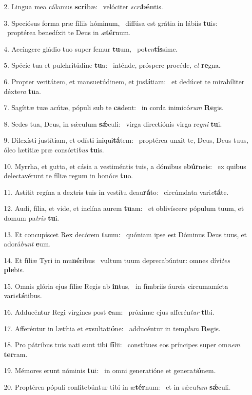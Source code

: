 2. Lingua mea cálamus \textbf{scri}bæ: \ast\  velóciter \textit{scri}\textbf{bén}tis.\

3. Speciósus forma præ fíliis hóminum, \dag\  diffúsa est grátia in lábiis \textbf{tu}is: \ast\  proptérea benedíxit te Deus in \textit{æ}\textbf{tér}num.\

4. Accíngere gládio tuo super femur \textbf{tu}um, \ast\  pot\textit{en}\textbf{tís}sime.\

5. Spécie tua et pulchritúdine \textbf{tu}a: \ast\  inténde, próspere procéde, \textit{et} \textbf{re}gna.\

6. Propter veritátem, et mansuetúdinem, et jus\textbf{tí}tiam: \ast\  et dedúcet te mirabíliter déxte\textit{ra} \textbf{tu}a.\

7. Sagíttæ tuæ acútæ, pópuli sub te \textbf{ca}dent: \ast\  in corda inimicó\textit{rum} \textbf{Re}gis.\

8. Sedes tua, Deus, in sǽculum \textbf{sǽ}culi: \ast\  virga directiónis virga re\textit{gni} \textbf{tu}i.\

9. Dilexísti justítiam, et odísti iniqui\textbf{tá}tem: \ast\  proptérea unxit te, Deus, Deus tuus, óleo lætítiæ præ consórti\textit{bus} \textbf{tu}is.\

10. Myrrha, et gutta, et cásia a vestiméntis tuis, a dómibus e\textbf{búr}neis: \ast\  ex quibus delectavérunt te fíliæ regum in honó\textit{re} \textbf{tu}o.\

11. Astitit regína a dextris tuis in vestítu deau\textbf{rá}to: \ast\  circúmdata vari\textit{e}\textbf{tá}te.\

12. Audi, fília, et vide, et inclína aurem \textbf{tu}am: \ast\  et oblivíscere pópulum tuum, et domum pa\textit{tris} \textbf{tu}i.\

13. Et concupíscet Rex decórem \textbf{tu}um: \ast\  quóniam ipse est Dóminus Deus tuus, et adorá\textit{bunt} \textbf{e}um.\

14. Et fíliæ Tyri in mu\textbf{né}ribus \ast\  vultum tuum deprecabúntur: omnes dívi\textit{tes} \textbf{ple}bis.\

15. Omnis glória ejus fíliæ Regis ab \textbf{in}tus, \ast\  in fímbriis áureis circumamícta vari\textit{e}\textbf{tá}tibus.\

16. Adducéntur Regi vírgines post \textbf{e}am: \ast\  próximæ ejus afferén\textit{tur} \textbf{ti}bi.\

17. Afferéntur in lætítia et exsultati\textbf{ó}ne: \ast\  adducéntur in tem\textit{plum} \textbf{Re}gis.\

18. Pro pátribus tuis nati sunt tibi \textbf{fí}lii: \ast\  constítues eos príncipes super om\textit{nem} \textbf{ter}ram.\

19. Mémores erunt nóminis \textbf{tu}i: \ast\  in omni generatióne et genera\textit{ti}\textbf{ó}nem.\

20. Proptérea pópuli confitebúntur tibi in æ\textbf{tér}num: \ast\  et in sǽcu\textit{lum} \textbf{sǽ}culi.\

